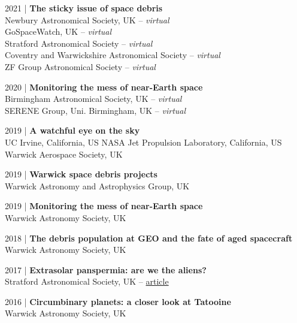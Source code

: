 \documentclass[10pt,a4paper]{altacv}
\begin{document}
\smallskip

\small 2021 | \textbf{The sticky issue of space debris} \\
Newbury Astronomical Society, UK -- \textit{virtual} \\
GoSpaceWatch, UK -- \textit{virtual}\\
Stratford Astronomical Society -- \textit{virtual} \\
Coventry and Warwickshire Astronomical Society -- \textit{virtual} \\
ZF Group Astronomical Society -- \textit{virtual}

\smallskip

\small 2020 | \textbf{Monitoring the mess of near-Earth space} \\
Birmingham Astronomical Society, UK -- \textit{virtual} \\
SERENE Group, Uni. Birmingham, UK -- \textit{virtual}

\smallskip

\small 2019 | \textbf{A watchful eye on the sky} \\
UC Irvine, California, US \linebreak
NASA Jet Propulsion Laboratory, California, US \linebreak
Warwick Aerospace Society, UK 

\smallskip

\small 2019 | \textbf{Warwick space debris projects} \\
Warwick Astronomy and Astrophysics Group, UK

\smallskip

\small 2019 | \textbf{Monitoring the mess of near-Earth space} \\
Warwick Astronomy Society, UK

\smallskip

\small 2018 | \textbf{The debris population at GEO and the fate of aged spacecraft} \\
Warwick Astronomy Society, UK

\smallskip

\small 2017 | \textbf{Extrasolar panspermia: are we the aliens?} \\
Stratford Astronomical Society, UK -- \href{http://www.astro.org.uk/news/nov17/}{article}

\smallskip

\small 2016 | \textbf{Circumbinary planets: a closer look at Tatooine} \\
Warwick Astronomy Society, UK
\end{document}
